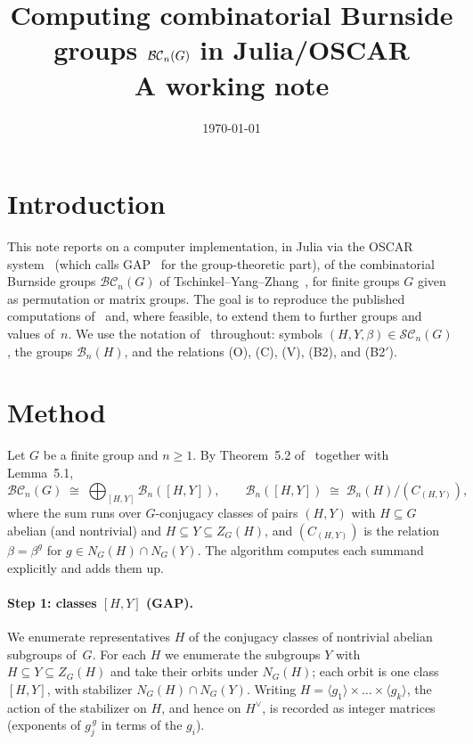 \documentclass[11pt]{article}
\title{Computing combinatorial Burnside groups $\BC_n(G)$ in Julia/OSCAR\\[2pt]
       \large A working note}
\author{\todo{author name(s)}}
\date{\today}
\newcommand{\BC}{\mathcal{BC}}   %
\newcommand{\SC}{\mathcal{SC}}   %
\newcommand{\B}{\mathcal{B}}     %
\newcommand{\dual}[1]{#1^{\vee}}
\newcommand{\Cen}[2]{Z_{#1}(#2)}  %
\newcommand{\Nor}[2]{N_{#1}(#2)}  %
\begin{document}
\maketitle

\section{Introduction}

This note reports on a computer implementation, in Julia via the OSCAR
system~\cite{OSCAR} (which calls GAP~\cite{GAP} for the group-theoretic part), of the
combinatorial Burnside groups $\BC_n(G)$ of Tschinkel--Yang--Zhang~\cite{TYZ}, for finite
groups $G$ given as permutation or matrix groups. The goal is to reproduce the published
computations of~\cite{TYZ} and, where feasible, to extend them to further groups and
values of~$n$. We use the notation of~\cite{TYZ} throughout: symbols
$(H,Y,\beta)\in\SC_n(G)$, the groups $\B_n(H)$, and the relations (O), (C), (V), (B2), and
(B2$'$).

\section{Method}

Let $G$ be a finite group and $n\ge 1$. By Theorem~5.2 of~\cite{TYZ} together with
Lemma~5.1,
\begin{equation}\label{eq:decomp}
  \BC_n(G)\;\cong\;\bigoplus_{[H,Y]}\B_n([H,Y]),
  \qquad
  \B_n([H,Y])\;\cong\;\B_n(H)\big/(C_{(H,Y)}),
\end{equation}
where the sum runs over $G$-conjugacy classes of pairs $(H,Y)$ with $H\subseteq G$ abelian
(and nontrivial) and $H\subseteq Y\subseteq \Cen{G}{H}$, and $(C_{(H,Y)})$ is the relation
$\beta=\beta^g$ for $g\in \Nor{G}{H}\cap \Nor{G}{Y}$. The algorithm computes each summand
explicitly and adds them up.

\paragraph{Step 1: classes $[H,Y]$ (GAP).}
We enumerate representatives $H$ of the conjugacy classes of nontrivial abelian subgroups
of~$G$. For each $H$ we enumerate the subgroups $Y$ with $H\subseteq Y\subseteq \Cen{G}{H}$
and take their orbits under $\Nor{G}{H}$; each orbit is one class $[H,Y]$, with stabilizer
$\Nor{G}{H}\cap \Nor{G}{Y}$. Writing $H=\langle g_1\rangle\times\dots\times\langle g_k\rangle$,
the action of the stabilizer on $H$, and hence on $\dual{H}$, is recorded as integer
matrices (exponents of $g_j^{\,g}$ in terms of the $g_i$).
\end{document}
